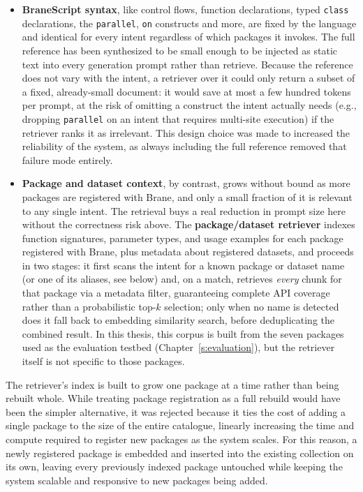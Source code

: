 \begin{itemize}
    \item \textbf{BraneScript syntax}, like control flows, function declarations,
        typed \texttt{class} declarations, the \texttt{parallel},
        \texttt{on} constructs and more, are fixed by the language and identical for
        every intent regardless of which packages it invokes. The full
        reference has been synthesized to be small enough to be injected as static text into
        every generation prompt rather than retrieve. Because the reference
        does not vary with the intent, a retriever over it could only return
        a subset of a fixed, already-small document: it would save at most a
        few hundred tokens per prompt, at the risk of omitting a construct
        the intent actually needs (e.g., dropping \texttt{parallel} on an
        intent that requires multi-site execution) if the retriever ranks it
        as irrelevant. This design choice was made to increased the reliability of the system, 
        as always including the full reference removed that failure mode entirely.
    \item \textbf{Package and dataset context}, by contrast, grows without
        bound as more packages are registered with Brane, and only a small
        fraction of it is relevant to any single intent. The retrieval buys a
        real reduction in prompt size here without the correctness risk
        above. The \textbf{package/dataset retriever} indexes function
        signatures, parameter types, and usage examples for each package
        registered with Brane, plus metadata about registered datasets, and
        proceeds in two stages: it first scans the intent for a known
        package or dataset name (or one of its aliases, see below) and, on a
        match, retrieves \emph{every} chunk for that package via a metadata
        filter, guaranteeing complete API coverage rather than a probabilistic
        top-$k$ selection; only when no name is detected does it fall back to
        embedding similarity search, before deduplicating the combined result. In
        this thesis, this corpus is built from the seven packages used as the
        evaluation testbed (Chapter~\ref{s:evaluation}), but the retriever
        itself is not specific to those packages.
\end{itemize}

The retriever's index is built to grow one package at a time rather than
being rebuilt whole. While treating package registration as a full rebuild would
have been the simpler alternative, it was rejected because it ties the cost of adding a single
package to the size of the entire catalogue, linearly increasing the time and compute 
required to register new packages as the system scales. 
For this reason, a newly registered package is embedded and inserted into the existing
collection on its own, leaving every previously indexed package untouched while keeping 
the system scalable and responsive to new packages being added.


